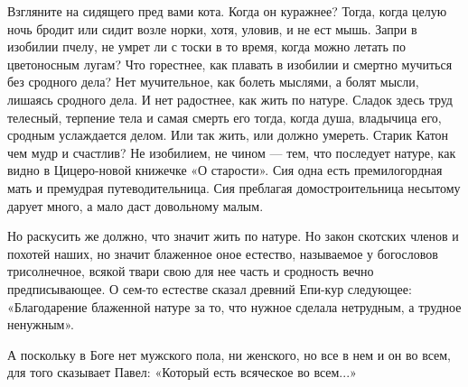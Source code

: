Взгляните на сидящего пред вами кота. Когда он куражнее? Тогда, когда целую
ночь бродит или сидит возле норки, хотя, уловив, и не ест мышь. Запри в
изобилии пчелу, не умрет ли с тоски в то время, когда можно летать по
цветоносным лугам? Что горестнее, как плавать в изобилии и смертно мучиться без
сродного дела? Нет мучительное, как болеть мыслями, а болят мысли, лишаясь
сродного дела. И нет радостнее, как жить по натуре. Сладок здесь труд телесный,
терпение тела и самая смерть его тогда, когда душа, владычица его, сродным
услаждается делом. Или так жить, или должно умереть. Старик Катон чем мудр и
счастлив? Не изобилием, не чином — тем, что последует натуре, как видно в
Цицеро-новой книжечке «О старости». Сия одна есть премилогордная мать и
премудрая путеводительница. Сия преблагая домостроительница несытому дарует
много, а мало даст довольному малым.

Но раскусить же должно, что значит жить по натуре. Но закон скотских членов и
похотей наших, но значит блаженное оное естество, называемое у богословов
трисолнечное, всякой твари свою для нее часть и сродность вечно предписывающее.
О сем-то естестве сказал древний Епи-кур следующее: «Благодарение блаженной
натуре за то, что нужное сделала нетрудным, а трудное ненужным».

А поскольку в Боге нет мужского пола, ни женского, но все в нем и он во всем,
для того сказывает Павел: «Который есть всяческое во всем...» 

